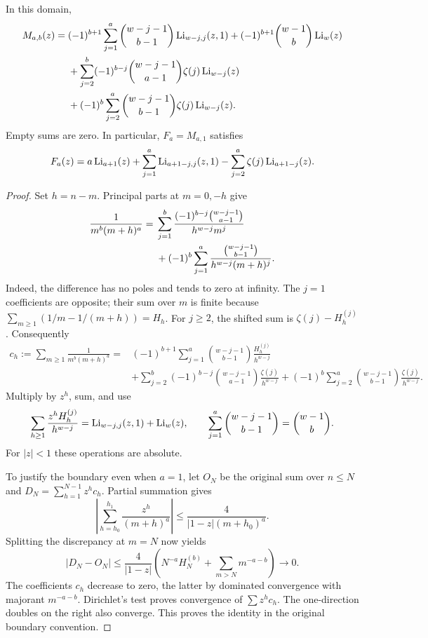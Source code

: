 \begin{theorem}\label{inverse:thm:mixed}
In this domain,
\begin{align}
M_{a,b}(z)
={}&(-1)^{b+1}\sum_{j=1}^{a}
 \binom{w-j-1}{b-1}\operatorname{Li}_{w-j,j}(z,1)
 +(-1)^{b+1}\binom{w-1}{b}\operatorname{Li}_w(z)\notag\\
&+\sum_{j=2}^{b}(-1)^{b-j}
 \binom{w-j-1}{a-1}\zeta(j)\operatorname{Li}_{w-j}(z)\notag\\
&+(-1)^b\sum_{j=2}^{a}
 \binom{w-j-1}{b-1}\zeta(j)\operatorname{Li}_{w-j}(z).
\label{inverse:eq:mixedgeneral}
\end{align}
Empty sums are zero. In particular, \(F_a=M_{a,1}\) satisfies
\begin{equation}
F_a(z)=a\operatorname{Li}_{a+1}(z)+\sum_{j=1}^{a}\operatorname{Li}_{a+1-j,j}(z,1)
       -\sum_{j=2}^{a}\zeta(j)\operatorname{Li}_{a+1-j}(z).
\label{inverse:eq:mixedb1}
\end{equation}
\end{theorem}

\begin{proof}
Set \(h=n-m\). Principal parts at \(m=0,-h\) give
\begin{align}
\frac1{m^b(m+h)^a}
={}&\sum_{j=1}^{b}
 \frac{(-1)^{b-j}\binom{w-j-1}{a-1}}{h^{w-j}m^j}\notag\\
&+(-1)^b\sum_{j=1}^{a}
 \frac{\binom{w-j-1}{b-1}}{h^{w-j}(m+h)^j}.
\label{inverse:eq:partialfraction}
\end{align}
Indeed, the difference has no poles and tends to zero at infinity.
The \(j=1\) coefficients are opposite; their sum over \(m\) is finite
because \(\sum_{m\ge1}(1/m-1/(m+h))=H_h\).
For \(j\ge2\), the shifted sum is \(\zeta(j)-H_h^{(j)}\).
Consequently
\begin{align*}
c_h:=\sum_{m\ge1}\frac1{m^b(m+h)^a}
={}&(-1)^{b+1}\sum_{j=1}^{a}
 \binom{w-j-1}{b-1}\frac{H_h^{(j)}}{h^{w-j}}\\
&+\sum_{j=2}^{b}(-1)^{b-j}\binom{w-j-1}{a-1}
   \frac{\zeta(j)}{h^{w-j}}
 +(-1)^b\sum_{j=2}^{a}\binom{w-j-1}{b-1}
   \frac{\zeta(j)}{h^{w-j}}.
\end{align*}
Multiply by \(z^h\), sum, and use
\[
\sum_{h\ge1}\frac{z^h H_h^{(j)}}{h^{w-j}}
=\operatorname{Li}_{w-j,j}(z,1)+\operatorname{Li}_w(z),\qquad
\sum_{j=1}^{a}\binom{w-j-1}{b-1}=\binom{w-1}{b}.
\]
For \(|z|<1\) these operations are absolute.

To justify the boundary even when \(a=1\), let \(O_N\) be the original
sum over \(n\le N\) and \(D_N=\sum_{h=1}^{N-1}z^h c_h\).
Partial summation gives
\[
\left|\sum_{h=h_0}^{h_1}\frac{z^h}{(m+h)^a}\right|
\le \frac{4}{|1-z|(m+h_0)^a}.
\]
Splitting the discrepancy at \(m=N\) now yields
\[
|D_N-O_N|
\le\frac4{|1-z|}
\left(N^{-a}H_N^{(b)}+\sum_{m>N}m^{-a-b}\right)\longrightarrow0.
\]
The coefficients \(c_h\) decrease to zero, the latter by dominated
convergence with majorant \(m^{-a-b}\).
Dirichlet's test proves convergence of \(\sum z^h c_h\).
The one-direction doubles on the right also converge. This proves the
identity in the original boundary convention.
\end{proof}

